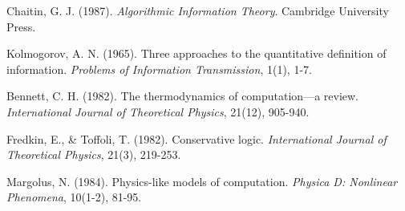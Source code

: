 \documentclass[11pt,a4paper]{article}
\theoremstyle{remark}
\begin{document}
\begin{thebibliography}{99}
Chaitin, G. J. (1987). \textit{Algorithmic Information Theory}. Cambridge University Press.

Kolmogorov, A. N. (1965). Three approaches to the quantitative definition of information. \textit{Problems of Information Transmission}, 1(1), 1-7.

Bennett, C. H. (1982). The thermodynamics of computation—a review. \textit{International Journal of Theoretical Physics}, 21(12), 905-940.

Fredkin, E., \& Toffoli, T. (1982). Conservative logic. \textit{International Journal of Theoretical Physics}, 21(3), 219-253.

Margolus, N. (1984). Physics-like models of computation. \textit{Physica D: Nonlinear Phenomena}, 10(1-2), 81-95.

\end{thebibliography}
\end{document}
